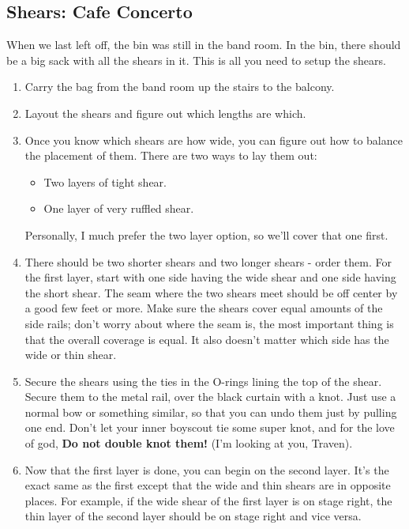 \documentclass[11pt,a4paper]{book}
\begin{document}
\subsection{Shears: Cafe Concerto}
When we last left off, the bin was still in the band room. In the bin, there should be a big sack with all the shears in it. This is all you need to setup the shears.
\begin{enumerate}
\item Carry the bag from the band room up the stairs to the balcony.
\item Layout the shears and figure out which lengths are which.
\item Once you know which shears are how wide, you can figure out how to balance the placement of them. There are two ways to lay them out: 
\begin{itemize}
\item Two layers of tight shear.
\item One layer of very ruffled shear. 
\end{itemize}

Personally, I much prefer the two layer option, so we'll cover that one first. 

\item There should be two shorter shears and two longer shears - order them. For the first layer, start with one side having the wide shear and one side having the short shear. The seam where the two shears meet should be off center by a good few feet or more. Make sure the shears cover equal amounts of the side rails; don't worry about where the seam is, the most important thing is that the overall coverage is equal. It also doesn't matter which side has the wide or thin shear.
\item Secure the shears using the ties in the O-rings lining the top of the shear. Secure them to the metal rail, over the black curtain with a knot. Just use a normal bow or something similar, so that you can undo them just by pulling one end. Don't let your inner boyscout tie some super knot, and for the love of god, \textbf{Do not double knot them!} (I'm looking at you, Traven).
\item Now that the first layer is done, you can begin on the second layer. It's the exact same as the first except that the wide and thin shears are in opposite places. For example, if the wide shear of the first layer is on stage right, the thin layer of the second layer should be on stage right and vice versa.  
\end{enumerate}
\end{document}
